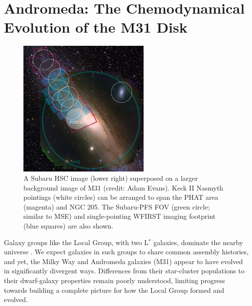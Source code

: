 \documentclass[11pt,a4paper,twoside,onecolumn,openany,final,oldfontcommands]{memoir}
\begin{document}
\section{Andromeda: The Chemodynamical Evolution of the M31 Disk}
\label{sec:m31disk}

\begin{figure}
\begin{center}
\includegraphics[width=0.58\textwidth]{figs/M31_footprint_v3.jpg}
\end{center}
\caption[M31 pointing distribution]{A Subaru HSC image (lower right) superposed on a larger background image of M31 (credit: Adam Evans).  Keck II Nasmyth pointings (white circles) can be arranged to span the PHAT area (magenta) and NGC 205.  The Subaru-PFS FOV (green circle; similar to MSE) and single-pointing WFIRST imaging footprint (blue squares) are also shown.}
\label{fig:M31}    
\end{figure}

Galaxy groups like the Local Group, with two L$^*$ galaxies, dominate the nearby universe \citep{kourkchi17}.  We expect galaxies in such groups to share common assembly histories, and yet, the Milky Way and Andromeda galaxies (M31) appear to have evolved in significantly divergent ways.  Differences from their star-cluster populations to their dwarf-galaxy properties remain poorly understood, limiting progress towards building a complete picture for how the Local Group formed and evolved.
\end{document}
